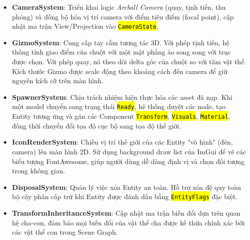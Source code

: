 \documentclass[a4paper]{article}
\newcommand{\code}[1]{\hl{\texttt{#1}}}
\begin{document}
\begin{itemize}
    \item \textbf{CameraSystem}: Triển khai logic \textit{Arcball Camera} (quay, tịnh tiến, thu phóng) và đồng bộ hóa vị trí camera với điểm tiêu điểm (focal point), cập nhật ma trận View/Projection vào \code{CameraState}.

    \item \textbf{GizmoSystem}: Cung cấp tay cầm tương tác 3D. Với phép tịnh tiến, hệ thống tính giao điểm của chuột với một mặt phẳng ảo song song với trục được chọn. Với phép quay, nó theo dõi delta góc của chuột so với tâm vật thể. Kích thước Gizmo được scale động theo khoảng cách đến camera để giữ nguyên kích cỡ trên màn hình.

    \item \textbf{SpawnerSystem}: Chịu trách nhiệm hiện thực hóa các asset đã nạp. Khi một model chuyển sang trạng thái \code{Ready}, hệ thống duyệt các node, tạo Entity tương ứng và gán các Component \code{Transform}, \code{Visuals}, \code{Material}, đồng thời chuyển đổi tọa độ cục bộ sang tọa độ thế giới.

    \item \textbf{IconRenderSystem}: Chiếu vị trí thế giới của các Entity "vô hình" (đèn, camera) lên màn hình 2D. Sử dụng background draw list của ImGui để vẽ các biểu tượng FontAwesome, giúp người dùng dễ dàng định vị và chọn đối tượng trong không gian.

    \item \textbf{DisposalSystem}: Quản lý việc xóa Entity an toàn. Hỗ trợ xóa đệ quy toàn bộ cây phân cấp trừ khi Entity được đánh dấu bằng \code{EntityFlags} đặc biệt.

    \item \textbf{TransformInheritanceSystem}: Cập nhật ma trận biến đổi dựa trên quan hệ cha-con, đảm bảo mọi biến đổi của vật thể cha được kế thừa chính xác bởi các vật thể con trong Scene Graph.
\end{itemize}
\end{document}
